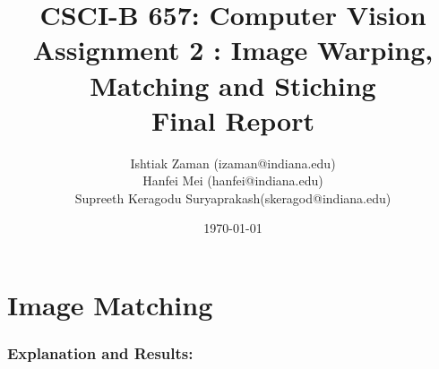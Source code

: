 \documentclass{article}
\begin{document}
\title{CSCI-B 657: Computer Vision \\ Assignment 2 : Image Warping, Matching and Stiching \\ Final Report}         %
	\author{Ishtiak Zaman (izaman@indiana.edu) \\ Hanfei Mei (hanfei@indiana.edu) \\Supreeth Keragodu Suryaprakash(skeragod@indiana.edu)}        %
	\date{\today}          %
	\maketitle
	
	\makeatother
	
	\pagestyle{plain}
		\part{Image Matching}
	
	\section{Explanation and Results: }
	
\end{document}
